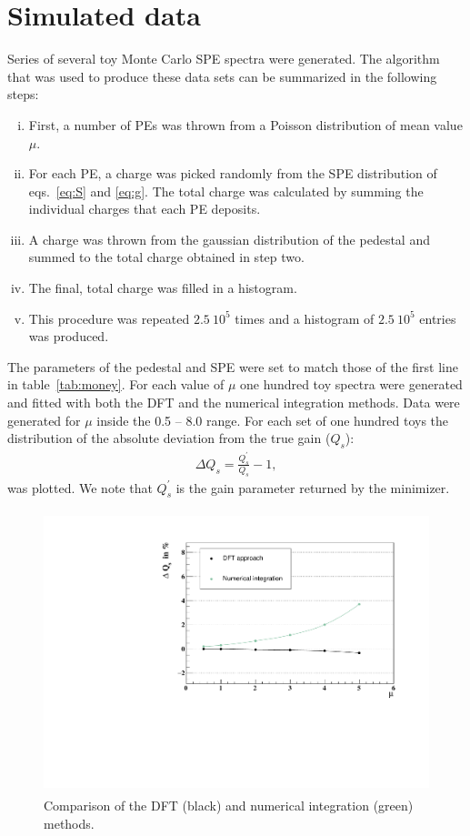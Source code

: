 \documentclass[a4paper,11pt]{article}
\begin{document}
\section{Simulated data}
\label{sec:mc}

Series of several toy Monte Carlo SPE spectra were generated. 
The algorithm that was used to produce these data sets can be summarized in the following steps:
\begin{enumerate}[i.]
\item First, a number of PEs was thrown from a Poisson distribution of mean value $\mu$.
\item For each PE, a charge was picked randomly from the SPE distribution of eqs.~\eqref{eq:S} and \eqref{eq:g}. 
The total charge was calculated by summing the individual charges that each PE deposits. 
\item A charge was thrown from the gaussian distribution of the pedestal and summed to the total charge obtained in step two. 
\item The final, total charge was filled in a histogram.  
\item This procedure was repeated $2.5\  10^5$ times and a histogram of $2.5\  10^5$ entries was produced. 
\end{enumerate}
The parameters of the pedestal and SPE were set to match those of the first line in table~\ref{tab:money}. 
For each value of $\mu$ one hundred toy spectra were generated and fitted with both the DFT and the numerical integration methods. 
Data were generated for $\mu$ inside the 0.5 -- 8.0 range. For each set of one hundred toys the distribution of the absolute deviation from the true gain ($Q_s$):
\begin{align}
\Delta Q_s = \frac{Q_s^\prime}{Q_s} - 1,
\end{align}  
was plotted. We note that $Q_s^\prime$ is the gain parameter returned by the minimizer. 

\begin{figure}[!t]
\centering
\includegraphics[width=11.5cm, height=8.2cm]{figures/comp.pdf} 
\caption{Comparison of the DFT (black) and numerical integration (green) methods. }
\label{fig:comp}
\end{figure}
\end{document}
